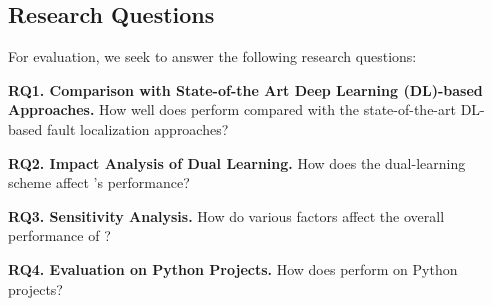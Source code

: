 \subsection{Research Questions}

For evaluation, we seek to answer the following research questions:

\noindent\textbf{RQ1. Comparison with State-of-the Art Deep Learning
  (DL)-based Approaches.}  How well does {\tool} perform compared with
the state-of-the-art DL-based fault localization approaches?

\noindent\textbf{RQ2. Impact Analysis of Dual Learning.} 
How does the dual-learning scheme affect {\tool}'s performance?

\noindent\textbf{RQ3. Sensitivity Analysis.} How do various factors affect the overall performance of {\tool}?


\noindent\textbf{RQ4. Evaluation on Python Projects.} How does {\tool}
perform on Python projects?
